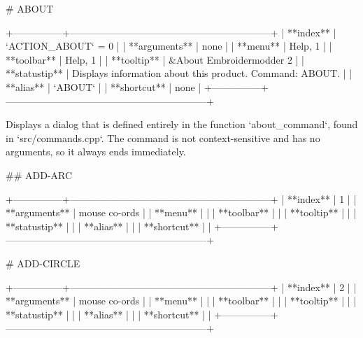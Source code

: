 # ABOUT

+---------------+--------------------------------------------------------------+
| **index**     | `ACTION_ABOUT` = 0                                           |
| **arguments** | none                                                         |
| **menu**      | Help, 1                                                      |
| **toolbar**   | Help, 1                                                      |
| **tooltip**   | &About Embroidermodder 2                                     |
| **statustip** | Displays information about this product. Command: ABOUT.     |
| **alias**     | `ABOUT`                                                      |
| **shortcut**  | none                                                         |
+---------------+--------------------------------------------------------------+

Displays a dialog that is defined entirely in the function `about_command`,
found in `src/commands.cpp`. The command is not context-sensitive and
has no arguments, so it always ends immediately.

## ADD-ARC

+---------------+--------------------------------------------------------------+
| **index**     | 1                                                            |
| **arguments** | mouse co-ords                                                |
| **menu**      |                                                              |
| **toolbar**   |                                                              |
| **tooltip**   |                                                              |
| **statustip** |                                                              |
| **alias**     |                                                              |
| **shortcut**  |                                                              |
+---------------+--------------------------------------------------------------+

# ADD-CIRCLE

+---------------+--------------------------------------------------------------+
| **index**     | 2                                                            |
| **arguments** | mouse co-ords                                                |
| **menu**      |                                                              |
| **toolbar**   |                                                              |
| **tooltip**   |                                                              |
| **statustip** |                                                              |
| **alias**     |                                                              |
| **shortcut**  |                                                              |
+---------------+--------------------------------------------------------------+

